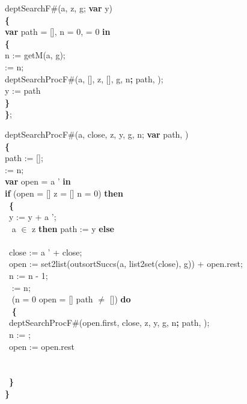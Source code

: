 {\parindent1cm 
deptSearchF\#(a, z, g; {\bf var} y) \\
{\bf \{}\\
{\bf var} path = [], n = 0,  = 0 {\bf in}\\
{\bf \{}\\
\tabbe n := getM(a, g);\\
\tabbe {} := n;\\
\tabbe deptSearchProcF\#(a, [], z, [], g, n{\bf ; }path, );\\
\tabbe y := path\\
{\bf \}}\\
{\bf \}};

\bigskip

deptSearchProcF\#(a, close, z, y, g, n; {\bf var} path, ) \\
{\bf \{}\\
path := [];\\
  := n;\\
 {\bf var} open = a ' {\bf in}\\
 {\bf if} \Not (open = [] \Or z = [] \Or n = 0) {\bf then}\\
 \tabif\  {\bf \{}\\
 \tabif\ \tabbe y := y + a ';\\
 \tabif\  a $\in$ z {\bf then} path := y {\bf else}\\
 \tabif\ \tabbe  {\bf \{}\\
 \tabif\ \tabbe \tabbe close := a ' + close;\\
 \tabif\ \tabbe \tabbe open := set2list(outsortSuccs(a, list2set(close), g)) + open.rest;\\
 \tabif\ \tabbe \tabbe n := n - 1;\\
 \tabif\ \tabbe \tabbe {} := n;\\
 \tabif\ \tabbe {} \Not (n = 0 \Or open = [] \Or path $\neq$ []) {\bf do}\\
 \tabif\ \tabbe \tabbe {} {\bf \{}\\
 \tabif\ \tabbe \tabbe {}\tabbe deptSearchProcF\#(open.first, close, z, y, g, n{\bf ; }path, );\\
 \tabif\ \tabbe \tabbe {}\tabbe n := ;\\
 \tabif\ \tabbe \tabbe {}\tabbe open := open.rest\\
 \tabif\ \tabbe \tabbe {}\\
 \tabif\ \tabbe {\bf \}}\\
 \tabif\ {\bf \}}\\
{\bf \}}
}




